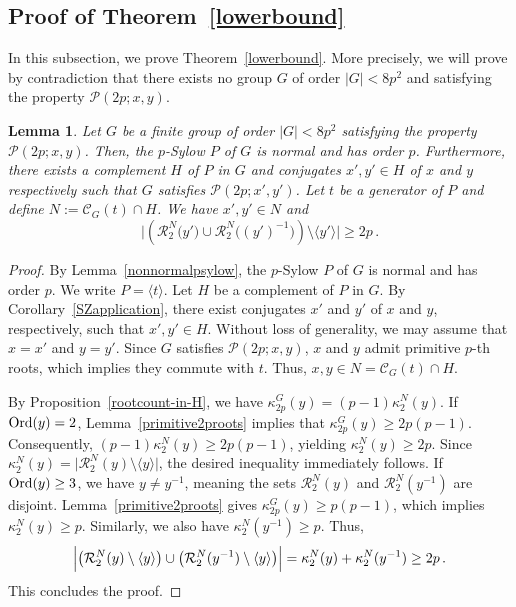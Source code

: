 \documentclass[12pt]{amsart}
\numberwithin{equation}{section}
\newcommand{\Ord}{{\rm Ord}}
\newtheorem{lem}[X]{Lemma}
\theoremstyle{definition}
\theoremstyle{remark}
\begin{document}
\subsection{Proof of Theorem~\ref{lowerbound}}\label{ptlb}
In this subsection, we prove Theorem~\ref{lowerbound}. More precisely, we will prove by contradiction that there exists no group $G$ of order $|G|<8p^2$ and satisfying the property $\mathcal{P}(2p;x,y)$.
\begin{lem}\label{square-rootsinN}
    Let $G$ be a finite group of order $|G|<8p^2$ satisfying the property $\mathcal{P}(2p;x,y)$. Then, the $p$-Sylow $P$ of $G$ is normal and has order $p$. Furthermore, there exists a complement $H$ of $P$ in $G$ and conjugates $x',y'\in H$ of $x$ and $y$ respectively such that $G$ satisfies $\mathcal{P}(2p;x',y')$. Let $t$ be a generator of $P$ and define $N:=\mathcal{C}_G(t)\cap H$. We have $x',y'\in N$ and 
    \[\bigl| \left(\mathcal{R}_2^N\bigl( y'\bigr)\cup \mathcal{R}_2^N\bigl( (y')^{-1}\bigr) \right)\setminus \langle y'\rangle\bigr| \ge 2p\, . \]
\end{lem}
\begin{proof}
    By Lemma~\ref{nonnormalpsylow}, the $p$-Sylow $P$ of $G$ is normal and has order $p$. We write $P=\langle t\rangle$. Let $H$ be a complement of $P$ in $G$. By Corollary~\ref{SZapplication}, there exist conjugates $x'$ and $y'$ of $x$ and $y$, respectively, such that $x',y'\in H$. Without loss of generality, we may assume that $x=x'$ and $y=y'$. Since $G$ satisfies $\mathcal{P}(2p;x,y)$, $x$ and $y$ admit primitive $p$-th roots, which implies they commute with $t$. Thus, $x,y\in N = \mathcal{C}_G(t)\cap H$.

    By Proposition~\ref{rootcount-in-H}, we have $\kappa_{2p}^G(y) = (p-1)\kappa_2^N(y)$. If $\Ord(y)=2$, Lemma~\ref{primitive2proots} implies that $\kappa_{2p}^G(y) \ge 2p(p-1)$. Consequently, $(p-1)\kappa_2^N(y) \ge 2p(p-1)$, yielding $\kappa_2^N(y) \ge 2p$. Since $\kappa_2^N(y) = \bigl| \mathcal{R}_2^N(y) \setminus \langle y \rangle \bigr|$, the desired inequality immediately follows. If $\Ord(y)\ge 3$, we have $y \ne y^{-1}$, meaning the sets $\mathcal{R}_2^N(y)$ and $\mathcal{R}_2^N(y^{-1})$ are disjoint.  Lemma~\ref{primitive2proots} gives $\kappa_{2p}^G(y) \ge p(p-1)$, which implies $\kappa_2^N(y) \ge p$. Similarly, we also have  $\kappa_2^N(y^{-1}) \ge p$. Thus, \[\Bigl|\bigl(\mathcal{R}_2^N(y)\setminus\langle y\rangle\bigr)\cup \bigl(\mathcal{R}_2^N(y^{-1})\setminus\langle y\rangle \bigr)\Bigr|=\kappa_2^N(y) + \kappa_2^N(y^{-1}) \ge 2p\, .\]
    This concludes the proof.
\end{proof}
\end{document}
